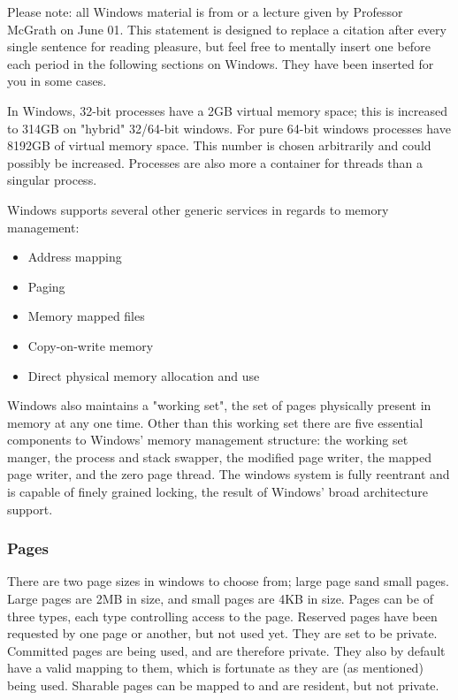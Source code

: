 \documentclass[10pt,draftclsnofoot,onecolumn,compsoc]{IEEEtran}
\begin{document}
	Please note: all Windows material is from \cite{WInternals} or a lecture given by Professor McGrath on June 01. This statement is designed to replace a citation \cite{WInternals} after every single sentence for reading pleasure, but feel free to mentally insert one before each period in the following sections on Windows. They have been inserted for you in some cases.
	
	In Windows, 32-bit processes have a 2GB virtual memory space; this is increased to 314GB on "hybrid" 32/64-bit windows. For pure 64-bit windows processes have 8192GB of virtual memory space. This number is chosen arbitrarily and could possibly be increased. Processes are also more a container for threads than a singular process.
	
	Windows supports several other generic services in regards to memory management:
	\begin{itemize}
		\item Address mapping
		\item Paging
		\item Memory mapped files
		\item Copy-on-write memory
		\item Direct physical memory allocation and use
	\end{itemize}
	
	Windows also maintains a "working set", the set of pages physically present in memory at any one time. Other than this working set there are five essential components to Windows' memory management structure: the working set manger, the process and stack swapper, the modified page writer, the mapped page writer, and the zero page thread. The windows system is fully reentrant and is capable of finely grained locking, the result of Windows' broad architecture support. 
	
	\subsubsection{Pages}
	
	There are two page sizes in windows to choose from; large page sand small pages. Large pages are 2MB in size, and small pages are 4KB in size. Pages can be of three types, each type controlling access to the page. Reserved pages have been requested by one page or another, but not used yet. They are set to be private. Committed pages are being used, and are therefore private. They also by default have a valid mapping to them, which is fortunate as they are (as mentioned) being used. Sharable pages can be mapped to and are resident, but not private.
	
\end{document}
